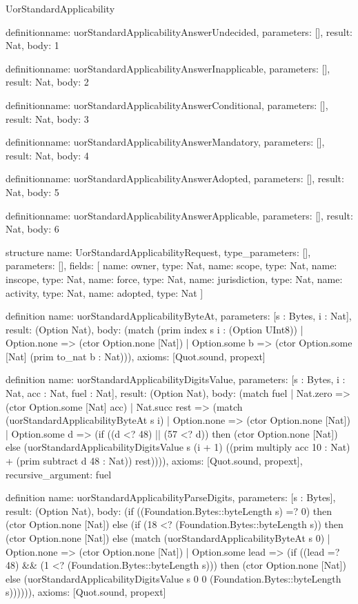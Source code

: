 \begin{lexlean}{UorStandardApplicability}
\begin{semanticmodule}
definition{name: uorStandardApplicabilityAnswerUndecided, parameters: [], result: Nat, body: 1}

definition{name: uorStandardApplicabilityAnswerInapplicable, parameters: [], result: Nat, body: 2}

definition{name: uorStandardApplicabilityAnswerConditional, parameters: [], result: Nat, body: 3}

definition{name: uorStandardApplicabilityAnswerMandatory, parameters: [], result: Nat, body: 4}

definition{name: uorStandardApplicabilityAnswerAdopted, parameters: [], result: Nat, body: 5}

definition{name: uorStandardApplicabilityAnswerApplicable, parameters: [], result: Nat, body: 6}

structure{
  name: UorStandardApplicabilityRequest,
  type_parameters: [],
  parameters: [],
  fields: [
    {name: owner, type: Nat},
    {name: scope, type: Nat},
    {name: inscope, type: Nat},
    {name: force, type: Nat},
    {name: jurisdiction, type: Nat},
    {name: activity, type: Nat},
    {name: adopted, type: Nat}
  ]
}

definition{
  name: uorStandardApplicabilityByteAt,
  parameters: [s : Bytes, i : Nat],
  result: (Option Nat),
  body: (match (prim index s i : (Option UInt8))
    | Option.none => (ctor Option.none [Nat])
    | Option.some b => (ctor Option.some [Nat] (prim to_nat b : Nat))),
  axioms: [Quot.sound, propext]
}

definition{
  name: uorStandardApplicabilityDigitsValue,
  parameters: [s : Bytes, i : Nat, acc : Nat, fuel : Nat],
  result: (Option Nat),
  body: (match fuel
    | Nat.zero => (ctor Option.some [Nat] acc)
    | Nat.succ rest => (match (uorStandardApplicabilityByteAt s i)
      | Option.none => (ctor Option.none [Nat])
      | Option.some d => (if ((d <? 48) || (57 <? d)) then (ctor Option.none [Nat]) else (uorStandardApplicabilityDigitsValue s (i + 1) ((prim multiply acc 10 : Nat) + (prim subtract d 48 : Nat)) rest)))),
  axioms: [Quot.sound, propext],
  recursive_argument: fuel
}

definition{
  name: uorStandardApplicabilityParseDigits,
  parameters: [s : Bytes],
  result: (Option Nat),
  body: (if ((Foundation.Bytes::byteLength s) =? 0) then (ctor Option.none [Nat]) else (if (18 <? (Foundation.Bytes::byteLength s)) then (ctor Option.none [Nat]) else (match (uorStandardApplicabilityByteAt s 0)
    | Option.none => (ctor Option.none [Nat])
    | Option.some lead => (if ((lead =? 48) && (1 <? (Foundation.Bytes::byteLength s))) then (ctor Option.none [Nat]) else (uorStandardApplicabilityDigitsValue s 0 0 (Foundation.Bytes::byteLength s)))))),
  axioms: [Quot.sound, propext]
}


\end{semanticmodule}
\end{lexlean}
